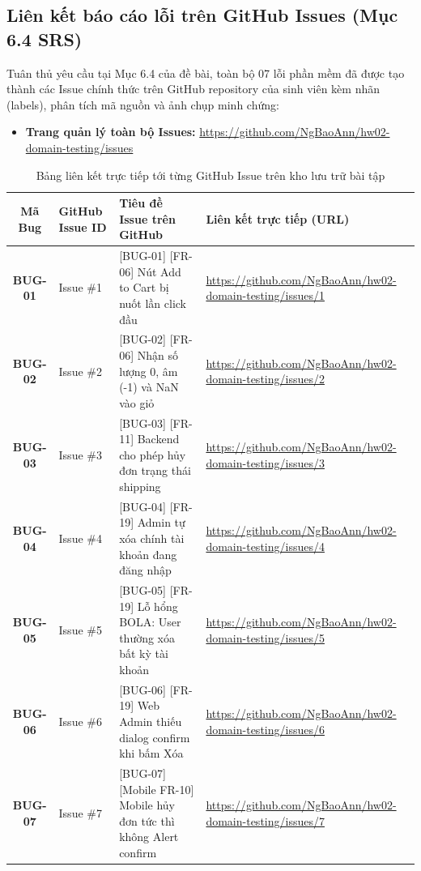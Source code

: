 \documentclass[11pt,a4paper]{article}
\begin{document}
\subsection{Liên kết báo cáo lỗi trên GitHub Issues (Mục 6.4 SRS)}
Tuân thủ yêu cầu tại Mục 6.4 của đề bài, toàn bộ 07 lỗi phần mềm đã được tạo thành các Issue chính thức trên GitHub repository của sinh viên kèm nhãn (labels), phân tích mã nguồn và ảnh chụp minh chứng:
\begin{itemize}
    \item \textbf{Trang quản lý toàn bộ Issues:} \url{https://github.com/NgBaoAnn/hw02-domain-testing/issues}
\end{itemize}

\begin{table}[h]
\centering
\small
\begin{tabularx}{\textwidth}{c l p{6cm} Y}
\toprule
\textbf{Mã Bug} & \textbf{GitHub Issue ID} & \textbf{Tiêu đề Issue trên GitHub} & \textbf{Liên kết trực tiếp (URL)} \\
\midrule
\textbf{BUG-01} & Issue \#1 & [BUG-01] [FR-06] Nút Add to Cart bị nuốt lần click đầu & \url{https://github.com/NgBaoAnn/hw02-domain-testing/issues/1} \\
\textbf{BUG-02} & Issue \#2 & [BUG-02] [FR-06] Nhận số lượng 0, âm (-1) và NaN vào giỏ & \url{https://github.com/NgBaoAnn/hw02-domain-testing/issues/2} \\
\textbf{BUG-03} & Issue \#3 & [BUG-03] [FR-11] Backend cho phép hủy đơn trạng thái shipping & \url{https://github.com/NgBaoAnn/hw02-domain-testing/issues/3} \\
\textbf{BUG-04} & Issue \#4 & [BUG-04] [FR-19] Admin tự xóa chính tài khoản đang đăng nhập & \url{https://github.com/NgBaoAnn/hw02-domain-testing/issues/4} \\
\textbf{BUG-05} & Issue \#5 & [BUG-05] [FR-19] Lỗ hổng BOLA: User thường xóa bất kỳ tài khoản & \url{https://github.com/NgBaoAnn/hw02-domain-testing/issues/5} \\
\textbf{BUG-06} & Issue \#6 & [BUG-06] [FR-19] Web Admin thiếu dialog confirm khi bấm Xóa & \url{https://github.com/NgBaoAnn/hw02-domain-testing/issues/6} \\
\textbf{BUG-07} & Issue \#7 & [BUG-07] [Mobile FR-10] Mobile hủy đơn tức thì không Alert confirm & \url{https://github.com/NgBaoAnn/hw02-domain-testing/issues/7} \\
\bottomrule
\end{tabularx}
\caption{Bảng liên kết trực tiếp tới từng GitHub Issue trên kho lưu trữ bài tập}
\end{table}
\end{document}
